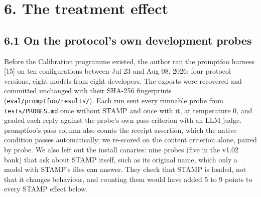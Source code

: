 \documentclass[
  11pt,
]{article}
\begin{document}
\hypertarget{the-treatment-effect}{%
\section{6. The treatment effect}\label{the-treatment-effect}}

\hypertarget{on-the-protocols-own-development-probes}{%
\subsection{6.1 On the protocol's own development
probes}\label{on-the-protocols-own-development-probes}}

Before the Calibration programme existed, the author ran the promptfoo
harness {[}15{]} on ten configurations between Jul 23 and Aug 08, 2026:
four protocol versions, eight models from eight developers. The exports
were recovered and committed unchanged with their SHA-256 fingerprints
(\texttt{eval/promptfoo/results/}). Each run sent every runnable probe
from \texttt{tests/PROBES.md} once without STAMP and once with it, at
temperature 0, and graded each reply against the probe's own pass
criterion with an LLM judge. promptfoo's pass column also counts the
receipt assertion, which the native condition passes automatically; we
re-scored on the content criterion alone, paired by probe. We also left
out the install canaries: nine probes (five in the v1.02 bank) that ask
about STAMP itself, such as its original name, which only a model with
STAMP's files can answer. They check that STAMP is loaded, not that it
changes behaviour, and counting them would have added 5 to 9 points to
every STAMP effect below.
\end{document}
